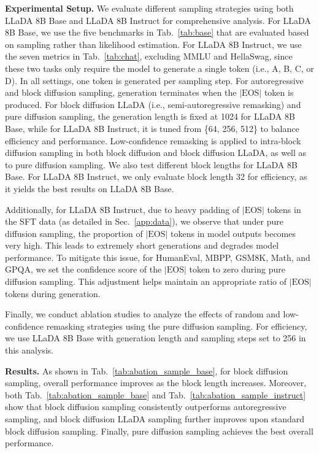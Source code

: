 \documentclass{article}
\begin{document}
\textbf{Experimental Setup.} We evaluate different sampling strategies using both LLaDA 8B Base and LLaDA 8B Instruct for comprehensive analysis. For LLaDA 8B Base, we use the five benchmarks in Tab.~\ref{tab:base} that are evaluated based on sampling rather than likelihood estimation. For LLaDA 8B Instruct, we use the seven metrics in Tab.~\ref{tab:chat}, excluding MMLU and HellaSwag, since these two tasks only require the model to generate a single token (i.e., A, B, C, or D). In all settings, one token is generated per sampling step. For autoregressive and block diffusion sampling, generation terminates when the $|\text{EOS}|$ token is produced. For block diffusion LLaDA (i.e., semi-autoregressive remasking) and pure diffusion sampling, the generation length is fixed at 1024 for LLaDA 8B Base, while for LLaDA 8B Instruct, it is tuned from \{64, 256, 512\} to balance efficiency and performance. Low-confidence remasking is applied to intra-block diffusion sampling in both block diffusion and block diffusion LLaDA, as well as to pure diffusion sampling. We also test different block lengths for LLaDA 8B Base. For LLaDA 8B Instruct, we only evaluate block length 32 for efficiency, as it yields the best results on LLaDA 8B Base.

Additionally, for LLaDA 8B Instruct, due to heavy padding of $|\text{EOS}|$ tokens in the SFT data (as detailed in Sec.~\ref{app:data}), we observe that under pure diffusion sampling, the proportion of $|\text{EOS}|$ tokens in model outputs becomes very high. This leads to extremely short generations and degrades model performance. To mitigate this issue, for HumanEval, MBPP, GSM8K, Math, and GPQA, we set the confidence score of the $|\text{EOS}|$ token to zero during pure diffusion sampling. This adjustment helps maintain an appropriate ratio of $|\text{EOS}|$ tokens during generation.

Finally, we conduct ablation studies to analyze the effects of random and low-confidence remasking strategies using the pure diffusion sampling. For efficiency, we use LLaDA 8B Base with generation length and sampling steps set to 256 in this analysis.

\textbf{Results.} As shown in Tab.~\ref{tab:abation_sample_base}, for block diffusion sampling, overall performance improves as the block length increases. Moreover, both Tab.~\ref{tab:abation_sample_base} and Tab.~\ref{tab:abation_sample_instruct} show that block diffusion sampling consistently outperforms autoregressive sampling, and block diffusion LLaDA sampling further improves upon standard block diffusion sampling. Finally, pure diffusion sampling achieves the best overall performance.
\end{document}
